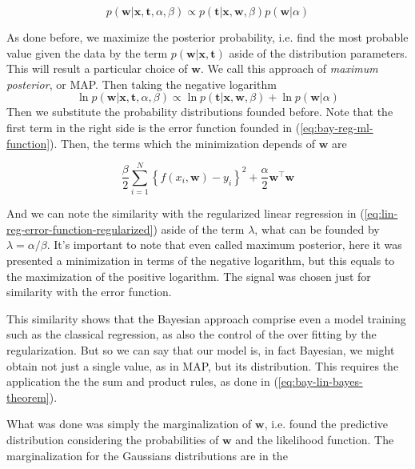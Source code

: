 \documentclass[11pt]{article} %
\begin{document}
\begin{equation}
   p(\mathbf{w} | \mathbf{x}, \mathbf{t}, \alpha, \beta) \propto p(\mathbf{t} | \mathbf{x}, \mathbf{w}, \beta) p(\mathbf{w} | \alpha)
\end{equation}

As done before, we maximize the posterior probability, i.e. find the most probable value given the data by the term $p(\mathbf{w} | \mathbf{x}, \mathbf{t}) $ aside of the distribution parameters. This will result a particular choice of $\mathbf{w}$. We call this approach of \textit{maximum posterior}, or MAP. Then taking the negative logarithm
%
\begin{equation}
   \ln p(\mathbf{w} | \mathbf{x}, \mathbf{t}, \alpha, \beta) \propto \ln p(\mathbf{t} | \mathbf{x}, \mathbf{w}, \beta) + \ln p(\mathbf{w} | \alpha)
\end{equation}
%
Then we substitute the probability distributions founded before. Note that the first term in the right side is the error function founded in (\ref{eq:bay-reg-ml-function}). Then, the terms which the minimization depends of $\mathbf{w}$ are

\begin{equation}
    \frac{\beta}{2} \sum_{i=1}^{N}\left\{f\left(x_{i}, \mathbf{w}\right)-y_{i}\right\}^{2} + \frac{\alpha}{2} \mathbf{w}^\top \mathbf{w}
\end{equation}

And we can note the similarity with the regularized linear regression in (\ref{eq:lin-reg-error-function-regularized}) aside of the term $\lambda$, what can be founded by $\lambda=\alpha / \beta$. It's important to note that even called maximum posterior, here it was presented a minimization in terms of the negative logarithm, but this equals to the maximization of the positive logarithm. The signal was chosen just for similarity with the error function.

This similarity shows that the Bayesian approach comprise even a model training such as the classical regression, as also the control of the over fitting by the regularization. But so we can say that our model is, in fact Bayesian, we might obtain not just a single value, as in MAP, but its distribution. This requires the application the the sum and product rules, as done in (\ref{eq:bay-lin-bayes-theorem}).

What was done was simply the marginalization of $\mathbf{w}$, i.e. found the predictive distribution considering the probabilities of $\mathbf{w}$ and the likelihood function. The marginalization for the Gaussians distributions are in the
\end{document}
